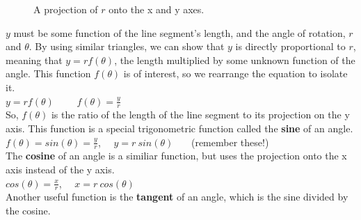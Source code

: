 \begin{figure}[htb]
\center
\caption{A projection of $r$ onto the x and y axes.}
\label{fig:projection_onto_axes}
\end{figure}

$y$ must be some function of the line segment's length, and the angle of rotation, $r$ and $\theta$.  By using similar triangles, we can show that $y$ is directly proportional to $r$, meaning that $y = rf(\theta)$, the length multiplied by some unknown function of the angle.  This function $f(\theta)$ is of interest, so we rearrange the equation to isolate it.\\

\tab$y = rf(\theta)$ \ \  \implies  \ \  $f(\theta)=\frac{y}{r}$\\

So, $f(\theta)$ is the ratio of the length of the line segment to its projection on the y axis.  This function is a special trigonometric function called the {\bf sine} of an angle. \\

\tab $f(\theta) = sin(\theta) = \frac{y}{r}$, \ \ $y = r \ sin(\theta)$ \ \ \ (remember these!)\\

The {\bf cosine} of an angle is a similiar function, but uses the projection onto the x axis instead of the y axis.\\

\tab $cos(\theta) = \frac{x}{r}$, \ \ $x = r \ cos(\theta)$ \\

Another useful function is the {\bf tangent} of an angle, which is the sine divided by the cosine.\\

